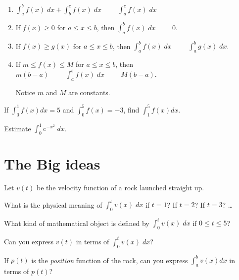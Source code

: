 \documentclass[../main.tex]{subfiles}
\begin{document}
\begin{enumerate}[label=(\arabic*), start=5]
  \item \(\int_{a}^{b} f(x) \;dx + \int_{b}^{c} f(x) \;dx \hspace{1cm} \int_{a}^{c} f(x) \; dx\)
    \vspace{1in}

  \item If \(f(x) \ge 0\) for \(a \le x \le b\), then \(\int_{a}^{b} f(x) \;dx \hspace{1cm} 0\).
    \vspace{1.5in}

  \item If \(f(x) \ge g(x)\) for \(a \le x \le b\), then \(\int_{a}^{b} f(x) \;dx \hspace{1cm} \int_{a}^{b} g(x) \;dx\).
    \vspace{1.5in}

  \item If \(m \le f(x) \le M\) for \(a \le x \le b\), then \(m(b-a) \hspace{1cm} \int_{a}^{b} f(x) \;dx \hspace{1cm} M (b-a)\). 

    Notice \(m\) and \(M\) are constants.
    \vspace{1.5in}
\end{enumerate}
\clearpage

\begin{example}
  If \(\int_{0}^{1} f(x) dx = 5\) and \(\int_{0}^{5} f(x) = -3\), find \(\int_{1}^{5} f(x) dx\).
\end{example}
\vfill

\begin{example}
  Estimate \(\int_{0}^{1} e^{-x^{2}} \;dx\).
\end{example}
\vfill

\clearpage

\section{The Big ideas}
\begin{example}
  Let \(v(t)\) be the velocity function of a rock launched straight up. 

  \faComments{} What is the physical meaning of \(\int_{0}^{t} v(x) \;dx\) if \(t = 1\)? If \(t = 2\)? If \(t = 3\)? \ldots{}
  \vspace{2in}

  \faComments{} What kind of mathematical object is defined by \(\int_{0}^{t} v(x) \;dx\) if \(0 \le t \le 5\)?
  \vspace{1in}

  \faComments{} Can you express \(v(t)\) in terms of \(\int_{0}^{t} v(x) \;dx\)?
  \vfill

  \faComments{} If \(p(t)\) is the \emph{position} function of the rock, can you express \(\int_{a}^{b} v(x) dx\) in terms of \(p(t)\)? 
  \vfill
\end{example}
\vfill
\end{document}
